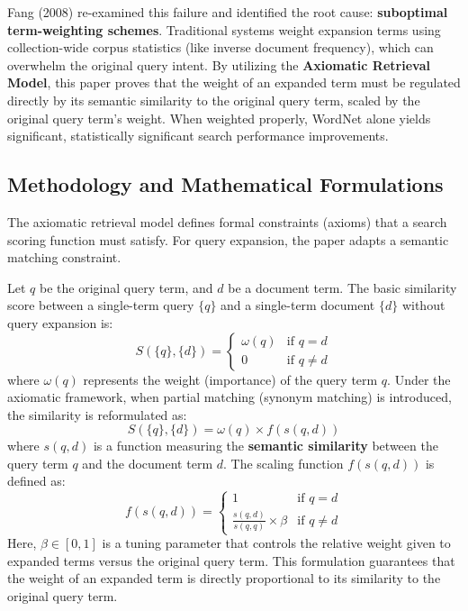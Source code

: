 \documentclass[11pt,a4paper]{article}
\begin{document}
Fang (2008) re-examined this failure and identified the root cause: \textbf{suboptimal term-weighting schemes}. Traditional systems weight expansion terms using collection-wide corpus statistics (like inverse document frequency), which can overwhelm the original query intent. By utilizing the \textbf{Axiomatic Retrieval Model}, this paper proves that the weight of an expanded term must be regulated directly by its semantic similarity to the original query term, scaled by the original query term's weight. When weighted properly, WordNet alone yields significant, statistically significant search performance improvements.

\subsection{Methodology and Mathematical Formulations}
The axiomatic retrieval model defines formal constraints (axioms) that a search scoring function must satisfy. For query expansion, the paper adapts a semantic matching constraint.

Let $q$ be the original query term, and $d$ be a document term. The basic similarity score between a single-term query $\{q\}$ and a single-term document $\{d\}$ without query expansion is:
\begin{equation}
S(\{q\}, \{d\}) = \begin{cases} \omega(q) & \text{if } q = d \\ 0 & \text{if } q \neq d \end{cases}
\end{equation}
where $\omega(q)$ represents the weight (importance) of the query term $q$. Under the axiomatic framework, when partial matching (synonym matching) is introduced, the similarity is reformulated as:
\begin{equation}
S(\{q\}, \{d\}) = \omega(q) \times f(s(q, d))
\end{equation}
where $s(q, d)$ is a function measuring the \textbf{semantic similarity} between the query term $q$ and the document term $d$. The scaling function $f(s(q, d))$ is defined as:
\begin{equation}
f(s(q, d)) = \begin{cases} 1 & \text{if } q = d \\ \frac{s(q, d)}{s(q, q)} \times \beta & \text{if } q \neq d \end{cases}
\end{equation}
Here, $\beta \in [0, 1]$ is a tuning parameter that controls the relative weight given to expanded terms versus the original query term. This formulation guarantees that the weight of an expanded term is directly proportional to its similarity to the original query term.
\end{document}
